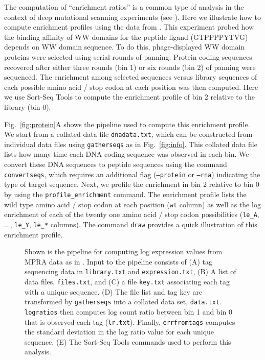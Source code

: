 \documentclass{bmcart}
\newcommand{\fig}[2]{Fig.\ \ref{#1}#2}
\begin{document}
The computation of ``enrichment ratios'' is a common type of analysis in the context of deep mutational scanning experiments (see \cite{Fowler:2014gq}). Here we illustrate how to compute enrichment profiles using the data from \cite{Fowler:2010gt}. This experiment probed how the binding affinity of WW domains for the peptide ligand (GTPPPPYTVG) depends on WW domain sequence. To do this, phage-displayed WW domain proteins were selected using serial rounds of panning. Protein coding sequences recovered after either three rounds (bin 1) or six rounds (bin 2) of panning were sequenced. The enrichment among selected sequences versus library sequences of each possible amino acid / stop codon at each position was then computed.   Here we use Sort-Seq Tools to compute the enrichment profile of bin 2 relative to the library (bin 0). 

\fig{fig:protein}{A} shows the pipeline used to compute this enrichment profile. We start from a collated data file \texttt{dnadata.txt}, which can be constructed from individual data files using  \texttt{gatherseqs} as in \fig{fig:info}{}. This collated data file lists how many time each DNA coding sequence was observed in each bin. We convert these DNA sequences to peptide sequences using the command \texttt{convertseqs}, which requires an additional flag (\texttt{--protein} or \texttt{--rna}) indicating the type of target sequence. Next, we profile the enrichment in bin 2 relative to bin 0 by using the \texttt{profile\_enrichment} command. The enrichment profile lists the wild type amino acid / stop codon at each position (\texttt{wt} column) as well as the log enrichment of each of the twenty one amino acid / stop codon possibilities (\texttt{le\_A}, ..., \texttt{le\_Y}, \texttt{le\_*} columns). The command \texttt{draw} provides a quick illustration of this enrichment profile. 

%
%
\begin{figure}[h!]
\caption{
Shown is the pipeline for computing log expression values from MPRA data as in \cite{Melnikov:2012dw}.
Input to the pipeline consists of (A) tag sequencing data in \texttt{library.txt} and \texttt{expression.txt}, (B) A list of data files, \texttt{files.txt}, and (C) a file \texttt{key.txt} associating each tag with a unique sequence. (D) The file list and tag key are transformed by \texttt{gatherseqs} into a collated data set, \texttt{data.txt}. \texttt{logratios} then computes log count ratio between bin 1 and bin 0 that is observed each tag (\texttt{lr.txt}). Finally, \texttt{errfromtags} computes the standard deviation in the log ratio value for each unique sequence. (E) The Sort-Seq Tools commands used to perform this analysis. 
}
\label{fig:tags}
\end{figure}
\end{document}
